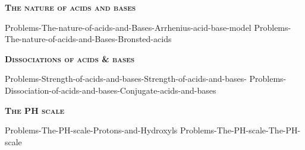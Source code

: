 \documentclass[main.tex]{subfiles}
\newcommand\chapterlabel{Ch-acidbase}
\begin{document}
\newpage
\setdoublesep{0.35700 em}  %
\setatomsep{1.78500 em}    %
\setbondoffset{0.18265 em} %
\renewcommand{\bondwidth}{0.06642 em} %
\setbondstyle{line width = \bondwidth}
\fancyhfoffset[E,O]{0pt}
\setlength{\columnsep}{30pt}
\begin{conclusion}
\iftoggle{chem121}{}{\setcounter{chapter}{5}}
\iftoggle{chem121}{\setcounter{chapter}{10}}{}
\end{conclusion}
\begin{multicols*}{2}\setcounter{numA}{1}  %



{\raggedright\textsc{\textbf{The nature of acids and bases}}\par}
 {Problems-The-nature-of-acids-and-Bases-Arrhenius-acid-base-model}
 {Problems-The-nature-of-acids-and-Bases-Bronsted-acids}
 
 \iftoggle{chem121}{}{
 {Problems-The-nature-of-acids-and-Bases-Lewis-acid-base-model}
}
{\raggedright\textsc{\textbf{Dissociations of acids \& bases}}\par}
 {Problems-Strength-of-acids-and-bases-Strength-of-acids-and-bases-}
 {Problems-Dissociation-of-acids-and-bases-Conjugate-acids-and-bases}
 
{\raggedright\textsc{\textbf{The PH scale}}\par}
 {Problems-The-PH-scale-Protons-and-Hydroxyls}
 {Problems-The-PH-scale-The-PH-scale}
 
 \iftoggle{chem121}{}{
  {\raggedright\textsc{\textbf{PH of strong acid-base solutions}}\par}
 {Problems-The-PH-scale-PH-of-strong-electrolyte-solutions} 

 
 {\raggedright\textsc{\textbf{PH of weak acid-base solutions}}\par}
 {Problems-The-PH-scale-PH-of-solutions-of-weak-acids-and-bases} 
 {Problems-The-PH-scale-PH-of-solutions-of-weak-acids-and-bases-Solutions-of-acids-and-bases} 
}	



\end{multicols*}
\end{document}
